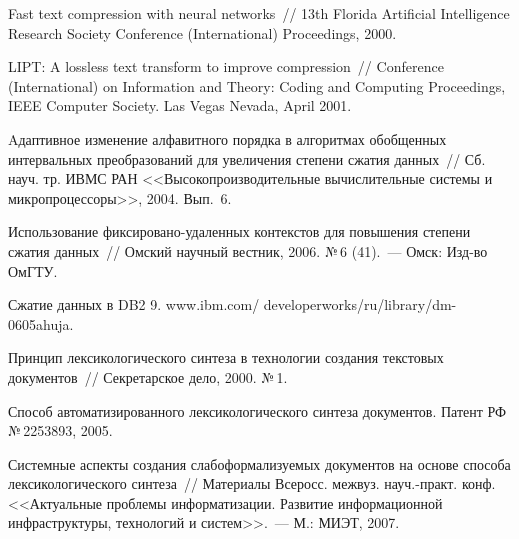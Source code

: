 \begin{multicols}{2}
{{\begin{thebibliography}{99}
Fast text compression with neural networks~// 13th Florida Artificial 
Intelligence Research Society Conference (International) Proceedings, 2000.

LIPT: A lossless text transform to improve compression~// Conference (International) on 
Information and Theory: Coding and Computing Proceedings, IEEE Computer Society. Las Vegas Nevada, 
April 2001.


Aдаптивное изменение алфавитного порядка в алгоритмах обобщенных интервальных 
преобразований для увеличения степени сжатия данных~// Сб. науч. тр. ИВМС РАН 
<<Высокопроизводительные вычислительные системы и микропроцессоры>>, 2004. 
Вып.~6.

Использование фиксировано-удаленных контекстов для повышения степени сжатия 
данных~// Омский научный вестник, 2006. №\,6 (41).~--- Омск: Изд-во ОмГТУ. 

Сжатие данных в DB2 9.  
{\sf www.ibm.com/ developerworks/ru/library/dm-0605ahuja}.


Принцип лексикологического синтеза в технологии создания текстовых документов~// 
Секретарское дело, 2000. №\,1.

Способ автоматизированного лексикологического синтеза документов. Патент РФ 
№\,2253893, 2005.

Системные аспекты создания слабоформализуемых документов на основе способа 
лексикологического синтеза~// Материалы Всеросс. межвуз. науч.-практ. конф. <<Актуальные 
проблемы информатизации. Развитие информационной инфраструктуры, технологий и 
систем>>.~--- М.: МИЭТ, 2007.


\label{end\stat}

 \end{thebibliography}
}
}
\end{multicols}
      
       
     
     

     